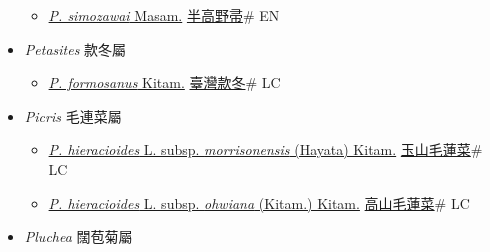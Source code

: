 \begin{itemize}
  \begin{itemize}
        \item[] \href{http://www.theplantlist.org/tpl1.1/search?q=Pertya+simozawai}{\textit{P. simozawai} Masam.}   \href{\detokenize{http://taibnet.sinica.edu.tw/chi/taibnet_species_list.php?T2=半高野帚&T2_new_value=true&fr=y}}{半高野帚}\# EN
  \end{itemize}
 \item[] \textit{Petasites} 款冬屬
                    
  \begin{itemize}
        \item[] \href{http://www.theplantlist.org/tpl1.1/search?q=Petasites+formosanus}{\textit{P. formosanus} Kitam.}   \href{\detokenize{http://taibnet.sinica.edu.tw/chi/taibnet_species_list.php?T2=臺灣款冬&T2_new_value=true&fr=y}}{臺灣款冬}\# LC
  \end{itemize}
 \item[] \textit{Picris} 毛連菜屬
                    
  \begin{itemize}
        \item[] \href{http://www.theplantlist.org/tpl1.1/search?q=Picris+hieracioides+subsp.+morrisonensis}{\textit{P. hieracioides} L. subsp. \textit{morrisonensis} (Hayata) Kitam.}   \href{\detokenize{http://taibnet.sinica.edu.tw/chi/taibnet_species_list.php?T2=玉山毛蓮菜&T2_new_value=true&fr=y}}{玉山毛蓮菜}\# LC
        \item[] \href{http://www.theplantlist.org/tpl1.1/search?q=Picris+hieracioides+subsp.+ohwiana}{\textit{P. hieracioides} L. subsp. \textit{ohwiana} (Kitam.) Kitam.}   \href{\detokenize{http://taibnet.sinica.edu.tw/chi/taibnet_species_list.php?T2=高山毛蓮菜&T2_new_value=true&fr=y}}{高山毛蓮菜}\# LC
  \end{itemize}
 \item[] \textit{Pluchea} 闊苞菊屬
                    

\end{itemize}
